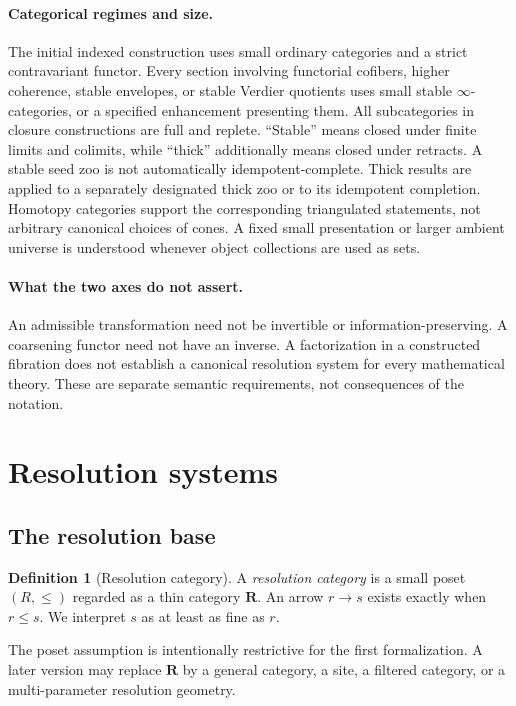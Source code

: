 \documentclass[11pt]{article}
\theoremstyle{definition}
\newtheorem{definition}[theorem]{Definition}
\theoremstyle{remark}
\newcommand{\Rcat}{\mathbf R}
\begin{document}
\paragraph{Categorical regimes and size.}
The initial indexed construction uses small ordinary categories and a strict contravariant functor. Every section involving functorial cofibers, higher coherence, stable envelopes, or stable Verdier quotients uses small stable $\infty$-categories, or a specified enhancement presenting them. All subcategories in closure constructions are full and replete. ``Stable'' means closed under finite limits and colimits, while ``thick'' additionally means closed under retracts. A stable seed zoo is not automatically idempotent-complete. Thick results are applied to a separately designated thick zoo or to its idempotent completion. Homotopy categories support the corresponding triangulated statements, not arbitrary canonical choices of cones. A fixed small presentation or larger ambient universe is understood whenever object collections are used as sets.

\paragraph{What the two axes do not assert.}
An admissible transformation need not be invertible or information-preserving. A coarsening functor need not have an inverse. A factorization in a constructed fibration does not establish a canonical resolution system for every mathematical theory. These are separate semantic requirements, not consequences of the notation.

\section{Resolution systems}

\subsection{The resolution base}

\begin{definition}[Resolution category]
A \emph{resolution category} is a small poset $(R,\le)$ regarded as a thin category $\Rcat$. An arrow $r\to s$ exists exactly when $r\le s$. We interpret $s$ as at least as fine as $r$.
\end{definition}

The poset assumption is intentionally restrictive for the first formalization. A later version may replace $\Rcat$ by a general category, a site, a filtered category, or a multi-parameter resolution geometry.
\end{document}
